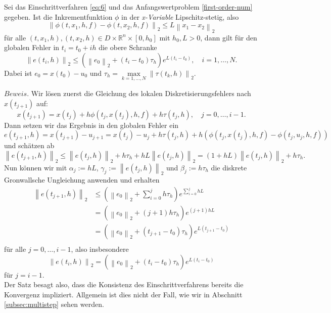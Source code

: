 \begin{satz}
    \label{one-step-error-bound}
    Sei das Einschrittverfahren \eqref{eq:6} und das Anfangswertproblem \eqref{first-order-num} gegeben. Ist  die
    Inkrementfunktion $\phi$ in der \textit{x-Variable} Lipschitz-stetig, also
    \[
        \left\lVert \phi(t, x_1, h, f) - \phi(t, x_2, h, f) \right\rVert_2 \leq L \left\lVert x_1 - x_2 \right\rVert_2
    \]
    für alle $(t, x_1, h),(t, x_2, h) \in D \times \mathbb{R}^n \times [0, h_0]$ mit $h_0, L>0$, dann gilt für den
    globalen Fehler in $t_i = t_0 + ih$ die obere Schranke
    \[
        \left\lVert e(t_i,h) \right\rVert_2 \leq \left( \left\lVert e_0 \right\rVert_2 + (t_i-t_0)\tau_h \right)
        e^{L(t_i-t_0)}, \quad i = 1, \dots, N.
    \]
    Dabei ist $e_0 = x(t_0)-u_0$ und $\tau_h= \max\limits_{k=1,\dots,N} \left\lVert \tau(t_k,h) \right\rVert_2 $.
\end{satz}
$Beweis.$ Wir lösen zuerst die Gleichung des lokalen Diskretisierungsfehlers nach $x(t_{j+1})$ auf:
\[
    x(t_{j+1}) = x(t_j) + h \phi(t_j, x(t_j),h,f) + h \tau(t_j, h), \quad j = 0, \dots , i-1.
\]
Dann setzen wir das Ergebnis in den globalen Fehler ein
\[
    e(t_{j+1},h) = x(t_{j+1}) - u_{j+1} = x(t_j) - u_j + h \tau(t_j, h)
    + h \left( \phi(t_j, x(t_j),h,f) - \phi(t_j, u_j, h, f) \right)
\]
und schätzen ab
\[
    \left\lVert e(t_{j+1},h) \right\rVert_2 \leq \left\lVert e(t_j, h) \right\rVert_2 + h\tau_h
    + hL\left\lVert e(t_j,h) \right\rVert_2 = (1 + hL) \left\lVert e(t_j,h) \right\rVert_2 + h\tau_h.
\]
Nun können wir mit $\alpha_j:=hL$, $\gamma_j:=\left\lVert e(t_j,h) \right\rVert_2$ und $\beta_j := h\tau_h$ die diskrete
Gronwallsche Ungleichung anwenden und erhalten
\begin{align*}
    \left\lVert e(t_{j+1},h) \right\rVert_2
    &\leq ( \left\lVert e_0 \right\rVert_2 + \sum_{i=0}^{j} h\tau_h ) e^{\sum_{i=0}^{j} hL } \\
    &= \left( \left\lVert e_0 \right\rVert_2 + (j+1)h \tau_h \right)e^{(j+1)hL} \\
    &= \left( \left\lVert e_0 \right\rVert_2 + (t_{j+1} - t_0) \tau_h \right)e^{L(t_{j+1} - t_0)} \\
\end{align*}
für alle $j=0, \dots, i-1$, also insbesondere
\[
    \left\lVert e(t_{i},h) \right\rVert_2
    = \left( \left\lVert e_0 \right\rVert_2 + (t_{i} - t_0) \tau_h \right)e^{L(t_{i} - t_0)}
\]
für $j=i-1$.\qedwhite\\
Der Satz besagt also, dass die Konsistenz des Einschrittverfahrens bereits die Konvergenz impliziert. Allgemein ist dies
nicht der Fall, wie wir in Abschnitt \ref{subsec:multistep} sehen werden.

